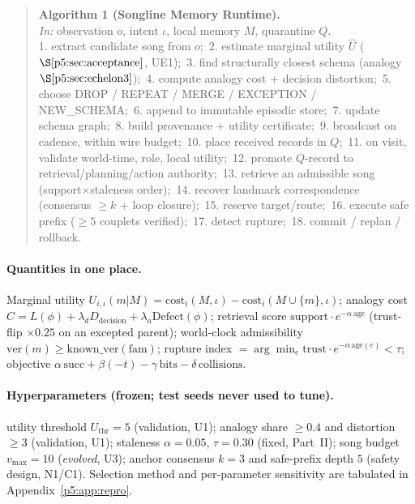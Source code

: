 \documentclass{article}
\begin{document}
\begin{quote}\small
\textbf{Algorithm 1 (Songline Memory Runtime).}\\
\emph{In:} observation $o$, intent $\iota$, local memory $M$,
quarantine $Q$.\\
1. extract candidate song from $o$;\
2. estimate marginal utility $\widehat U$ ($\S\ref{p5:sec:acceptance}$,
UE1);\
3. find structurally closest schema (analogy $\S\ref{p5:sec:echelon3}$);\
4. compute analogy cost + decision distortion;\
5. choose DROP / REPEAT / MERGE / EXCEPTION / NEW\_SCHEMA;\
6. append to immutable episodic store;\
7. update schema graph;\
8. build provenance + utility certificate;\
9. broadcast on cadence, within wire budget;\
10. place received records in $Q$;\
11. on visit, validate world-time, role, local utility;\
12. promote $Q$-record to retrieval/planning/action authority;\
13. retrieve an admissible song (support$\times$staleness order);\
14. recover landmark correspondence (consensus $\ge k$ + loop
closure);\
15. reserve target/route;\
16. execute safe prefix ($\ge 5$ couplets verified);\
17. detect rupture;\
18. commit / replan / rollback.
\end{quote}

\paragraph{Quantities in one place.} Marginal utility
$U_{i,\iota}(m|M)=\mathrm{cost}_i(M,\iota)-\mathrm{cost}_i(M\cup\{m\},
\iota)$; analogy cost $C=L(\phi)+\lambda_d D_{\mathrm{decision}}
+\lambda_a\mathrm{Defect}(\phi)$; retrieval score
$\mathrm{support}\cdot e^{-\alpha\,\mathrm{age}}$ (trust-flip $\times
0.25$ on an excepted parent); world-clock admissibility
$\mathrm{ver}(m)\ge\mathrm{known\_ver}(\mathrm{fam})$; rupture index
$=\arg\min_e \mathrm{trust}\cdot e^{-\alpha\,\mathrm{age}(e)}<\tau$;
objective $\alpha\,\mathrm{succ}+\beta(-t)-\gamma\,\mathrm{bits}
-\delta\,\mathrm{collisions}$.

\paragraph{Hyperparameters (frozen; test seeds never used to tune).}
utility threshold $U_{\mathrm{thr}}{=}5$ (validation, U1); analogy
share $\ge0.4$ and distortion $\ge3$ (validation, U1); staleness
$\alpha{=}0.05$, $\tau{=}0.30$ (fixed, Part~II); song budget
$v_{\max}{=}10$ (\emph{evolved}, U3); anchor consensus $k{=}3$ and
safe-prefix depth $5$ (safety design, N1/C1). Selection method and
per-parameter sensitivity are tabulated in
Appendix~\ref{p5:app:repro}.
\end{document}
